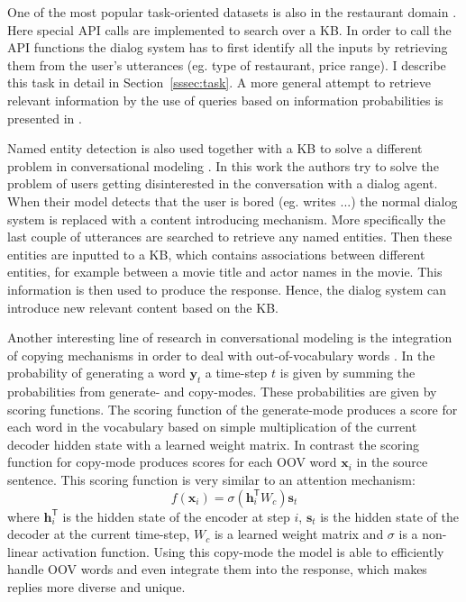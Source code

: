 \documentclass[12pt]{article}
\begin{document}
One of the most popular task-oriented datasets is also in the restaurant domain \cite{Joshi:2017}. Here special API calls are implemented to search over a KB. In order to call the API functions the dialog system has to first identify all the inputs by retrieving them from the user's utterances (eg. type of restaurant, price range). I describe this task in detail in Section~\ref{sssec:task}. A more general attempt to retrieve relevant information by the use of queries based on information probabilities is presented in \cite{Yin:2017}.

Named entity detection is also used together with a KB to solve a different problem in conversational modeling \cite{stalemate:2016}. In this work the authors try to solve the problem of users getting disinterested in the conversation with a dialog agent. When their model detects that the user is bored (eg. writes ...) the normal dialog system is replaced with a content introducing mechanism. More specifically the last couple of utterances are searched to retrieve any named entities. Then these entities are inputted to a KB, which contains associations between different entities, for example between a movie title and actor names in the movie. This information is then used to produce the response. Hence, the dialog system can introduce new relevant content based on the KB.

Another interesting line of research in conversational modeling is the integration of copying mechanisms in order to deal with out-of-vocabulary words \cite{Eric:2017,Gu:2016}. In \cite{Gu:2016} the probability of generating a word \(\bm{y}_t\) a time-step \(t\) is given by summing the probabilities from generate- and copy-modes. These probabilities are given by scoring functions. The scoring function of the generate-mode produces a score for each word in the vocabulary based on simple multiplication of the current decoder hidden state with a learned weight matrix. In contrast the scoring function for copy-mode produces scores for each OOV word \(\bm{x}_i\) in the source sentence. This scoring function is very similar to an attention mechanism:
\begin{equation}
f(\bm{x}_i)=\sigma(\bm{h}_{i}^{\mathsf{T}}W_c)\bm{s}_t
\end{equation}
where \(\bm{h}_{i}^{\mathsf{T}}\) is the hidden state of the encoder at step \(i\), \(\bm{s}_t\) is the hidden state of the decoder at the current time-step, \(W_c\) is a learned weight matrix and \(\sigma\) is a non-linear activation function. Using this copy-mode the model is able to efficiently handle OOV words and even integrate them into the response, which makes replies more diverse and unique.
\end{document}
